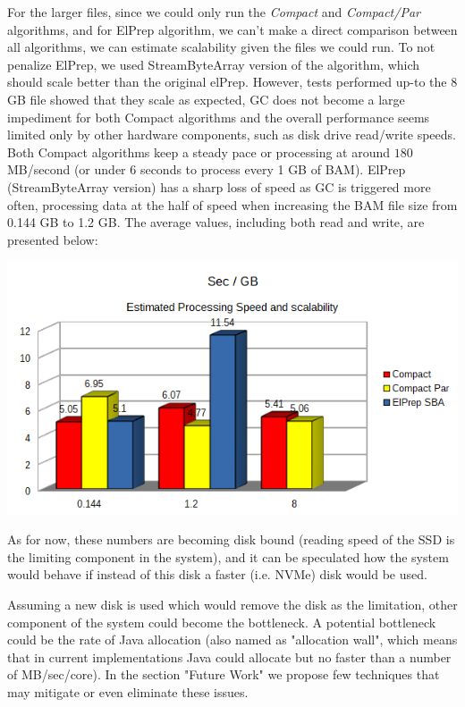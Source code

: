 \documentclass[a4paper,twoside]{article}
\begin{document}
For the larger files, since we could only run the {\it Compact} and {\it Compact/Par} algorithms, and for ElPrep algorithm, we can't make a direct comparison between all algorithms, we can estimate scalability given the files we could run. To not penalize ElPrep, we used StreamByteArray 
version of the algorithm, which should scale better than the original elPrep.  However, tests performed up-to the $8$ GB file showed that they scale as expected, GC does not become a large impediment for both Compact algorithms and the overall performance seems limited only by other hardware components, such as disk drive read/write speeds.
Both Compact algorithms keep a steady pace or processing at around $180$ MB/second (or under 6 seconds to process every 1 GB of BAM). ElPrep (StreamByteArray version) has a sharp loss of speed as GC is triggered more often, processing data at the half of speed when increasing the BAM file size from 0.144 GB to 1.2 GB.
The average values, including both read and write, are presented below:

\begin{center}
	\includegraphics[scale=0.5]{images/seconds_per_gb_ryzen.png}
\end{center}


As for now, these numbers are becoming disk bound (reading speed of the SSD is the limiting component in the system), and it can be speculated how the system would behave if instead of this disk a faster (i.e. NVMe) disk would be used.

Assuming a new disk is used which would remove the disk as the limitation, other component of the system could become the bottleneck. A potential bottleneck could be the rate of Java allocation (also named as "allocation wall", which means that in current
implementations Java could allocate but no faster than a number of MB/sec/core). In the section "Future Work" we propose few techniques that may mitigate or even eliminate these issues.
\end{document}
